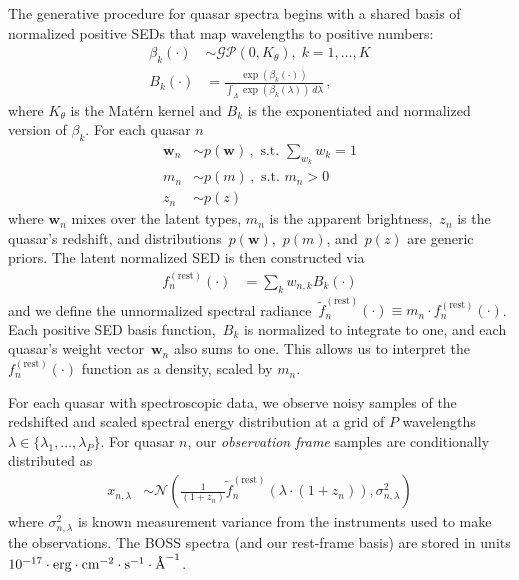 \documentclass{article}
\newcommand{\angstrom}{\textup{\AA}}
\begin{document}
The generative procedure for quasar spectra begins with a shared basis of normalized positive SEDs that map wavelengths to positive numbers:
\begin{align}
  \beta_k(\cdot) &\sim \mathcal{GP}(0, K_\theta),\; k=1, \dots, K\\
  B_k(\cdot) &= \frac{\exp(\beta_k(\cdot))}{\int_\Lambda \exp(\beta_k(\lambda))\, d\lambda}   \, ,
\end{align}
where $K_{\theta}$ is the Mat\'{e}rn kernel and $B_k$ is the exponentiated and normalized version of $\beta_k$. For each quasar $n$
\begin{align}
  \mathbf{w}_n &\sim p(\mathbf{w}) \, , \text{ s.t. } \sum_{w_k} w_k = 1  \\
  m_n  &\sim p(m) \, , \text{ s.t. } m_n > 0 \\
  z_n &\sim p(z)
\end{align}
where $\mathbf{w}_n$ mixes over the latent types, $m_n$ is the apparent brightness,~$z_n$ is the quasar's redshift, and distributions~$p(\mathbf{w})$,~$p(m)$, and~$p(z)$ are generic priors. 
The latent normalized SED is then constructed via
\begin{align}
  f^{(\text{rest})}_n(\cdot) &= \sum_{k} w_{n,k} B_k(\cdot)
  \label{eqn:restsed}
\end{align}
and we define the unnormalized spectral radiance~${\tilde f^{(\text{rest})}_n(\cdot) \equiv m_n \cdot f^{(\text{rest})}_n(\cdot)}$. 
Each positive SED basis function,~$B_k$ is normalized to integrate to one, and each quasar's weight vector~$\mathbf{w}_n$ also sums to one.
This allows us to interpret the~$f^{(\text{rest})}_n(\cdot)$ function as a density, scaled by $m_n$. 

For each quasar with spectroscopic data, we observe noisy samples of the redshifted and scaled spectral energy distribution at a grid of $P$ wavelengths ${\lambda \in \{\lambda_1, \dots, \lambda_P \}}$.
For quasar $n$, our \emph{observation frame} samples are conditionally distributed as
\begin{align}
  x_{n, \lambda} 
    &\sim \mathcal{N}\left( \frac{1}{(1 + z_n)} \tilde f_n^{(\text{rest})}( \lambda \cdot (1 + z_n) ), \sigma_{n,\lambda}^2 \right)
    \label{eq:spec} 
\end{align}
where $\sigma_{n, \lambda}^2$ is known measurement variance from the instruments used to make the observations. 
The BOSS spectra (and our rest-frame basis) are stored in units ${10^{-17} \cdot \text{erg} \cdot \text{cm}^{-2} \cdot \text{s}^{-1} \cdot \angstrom^{-1}}$.  
\end{document}
